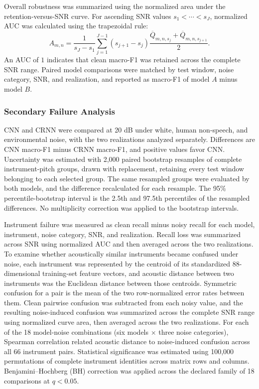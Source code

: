 \documentclass[conference]{IEEEtran}
\begin{document}
Overall robustness was summarized using the normalized area under the retention-versus-SNR curve. For ascending SNR values $s_1<\cdots<s_J$, normalized AUC was calculated using the trapezoidal rule:
\begin{equation}
A_{m,n}
=
\frac{1}{s_J-s_1}
\sum_{j=1}^{J-1}
\left(s_{j+1}-s_j\right)
\frac{
\overline{Q}_{m,n,s_j}
+
\overline{Q}_{m,n,s_{j+1}}
}{2}.
\label{eq:retention_auc}
\end{equation}
An AUC of $1$ indicates that clean macro-F1 was retained across the complete SNR range. Paired model comparisons were matched by test window, noise category, SNR, and realization, and reported as macro-F1 of model $A$ minus model $B$.


\subsubsection{Secondary Failure Analysis}

CNN and CRNN were compared at 20 dB under white, human non-speech, and environmental noise, with the two realizations analyzed separately. Differences are CNN macro-F1 minus CRNN macro-F1, and positive values favor CNN. Uncertainty was estimated with 2,000 paired bootstrap resamples of complete instrument-pitch groups, drawn with replacement, retaining every test window belonging to each selected group. The same resampled groups were evaluated by both models, and the difference recalculated for each resample. The 95\% percentile-bootstrap interval is the 2.5th and 97.5th percentiles of the resampled differences. No multiplicity correction was applied to the bootstrap intervals.

Instrument failure was measured as clean recall minus noisy recall for each model, instrument, noise category, SNR, and realization. Recall loss was summarized across SNR using normalized AUC and then averaged across the two realizations. To examine whether acoustically similar instruments became confused under noise, each instrument was represented by the centroid of its standardized 88-dimensional training-set feature vectors, and acoustic distance between two instruments was the Euclidean distance between those centroids. Symmetric confusion for a pair is the mean of the two row-normalized error rates between them. Clean pairwise confusion was subtracted from each noisy value, and the resulting noise-induced confusion was summarized across the complete SNR range using normalized curve area, then averaged across the two realizations. For each of the 18 model-noise combinations (six models $\times$ three noise categories), Spearman correlation related acoustic distance to noise-induced confusion across all 66 instrument pairs. Statistical significance was estimated using 100,000 permutations of complete instrument identities across matrix rows and columns. Benjamini--Hochberg (BH) correction was applied across the declared family of 18 comparisons at $q<0.05$.
\end{document}
